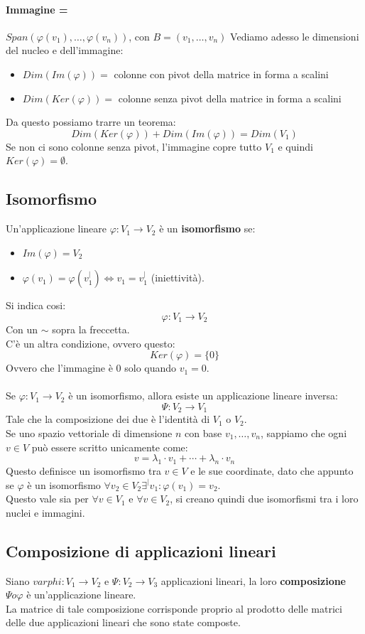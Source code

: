 \documentclass[12pt,a4paper]{article}
\begin{document}
\paragraph{Immagine = } $Span(\varphi(v_1),\ldots,\varphi(v_n))$, con $B = (v_1,\ldots,v_n)$
Vediamo adesso le dimensioni del nucleo e dell'immagine:
\begin{itemize}
  \item $Dim(Im(\varphi)) = $ colonne con pivot della matrice in forma a scalini
  \item $Dim(Ker(\varphi)) = $ colonne senza pivot della matrice in forma a scalini
\end{itemize}
Da questo possiamo trarre un teorema:
\[
Dim(Ker(\varphi)) + Dim(Im(\varphi)) = Dim(V_1)
\]
Se non ci sono colonne senza pivot, l'immagine copre tutto $V_1$ e quindi $Ker(\varphi) = \emptyset$.
\subsection{Isomorfismo}
Un'applicazione lineare $\varphi: V_1 \to V_2$ è un \textbf{isomorfismo} se:
\begin{itemize}
  \item $Im(\varphi) = V_2$
  \item $\varphi(v_1) = \varphi(v_1^|) \Leftrightarrow v_1 = v_1^|$ (iniettività).
\end{itemize}
Si indica cosi:
\[
\varphi: V_1 \to V_2
\]
Con un $\sim $ sopra la freccetta.\\
C'è un altra condizione, ovvero questo:
\[
Ker(\varphi) = \{0\}
\]
Ovvero che l'immagine è $0$ solo quando $v_1 = 0$.\\\\
Se $\varphi: V_1 \to V_2$ è un isomorfismo, allora esiste un applicazione lineare inversa:
\[
\varPsi:V_2 \to V_1
\]
Tale che la composizione dei due è l'identità di $V_1$ o $V_2$.\\
Se uno spazio vettoriale di dimensione $n$ con base $v_1,\ldots,v_n$, sappiamo che ogni $v \in V$ può essere scritto unicamente come:
\[
v = \lambda_1 \cdot v_1 + \cdots + \lambda_n \cdot v_n
\]
Questo definisce un isomorfismo tra $v \in V$ e le sue coordinate, dato che appunto se $\varphi$ è un isomorfismo $\forall v_2 \in V_2 \exists^| v_1 : \varphi(v_1) = v_2$.\\
Questo vale sia per $\forall v \in V_1$ e $\forall v \in V_2$, si creano quindi due isomorfismi tra i loro nuclei e immagini.

\subsection{Composizione di applicazioni lineari}
Siano $varphi:V_1 \to V_2$ e $\varPsi:V_2 \to V_3$ applicazioni lineari, la loro \textbf{composizione} $\varPsi o \varphi$ è un'applicazione lineare.\\
La matrice di tale composizione corrisponde proprio al prodotto delle matrici delle due applicazioni lineari che sono state composte.\\
\end{document}
